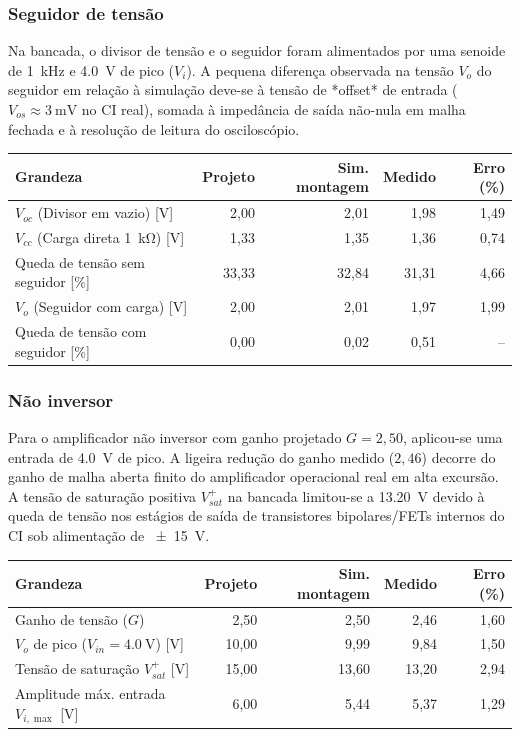 \documentclass[11pt,a4paper]{article}
\begin{document}
\subsubsection{Seguidor de tensão}

Na bancada, o divisor de tensão e o seguidor foram alimentados por uma senoide de \SI{1}{\kilo\hertz} e \SI{4,0}{\volt} de pico ($V_i$). A pequena diferença observada na tensão $V_o$ do seguidor em relação à simulação deve-se à tensão de *offset* de entrada ($V_{os} \approx \SI{3}{\milli\volt}$ no CI real), somada à impedância de saída não-nula em malha fechada e à resolução de leitura do osciloscópio.

\begin{center}
\begin{tabular}{@{}lrrrr@{}}
\toprule
\textbf{Grandeza} & \textbf{Projeto} & \textbf{Sim. montagem} & \textbf{Medido} & \textbf{Erro (\%)} \\
\midrule
$V_{oc}$ (Divisor em vazio) [\si{\volt}] & 2,00 & 2,01 & 1,98 & 1,49 \\
$V_{cc}$ (Carga direta \SI{1}{\kilo\ohm}) [\si{\volt}] & 1,33 & 1,35 & 1,36 & 0,74 \\
Queda de tensão sem seguidor [\%] & 33,33 & 32,84 & 31,31 & 4,66 \\
$V_o$ (Seguidor com carga) [\si{\volt}] & 2,00 & 2,01 & 1,97 & 1,99 \\
Queda de tensão com seguidor [\%] & 0,00 & 0,02 & 0,51 & -- \\
\bottomrule
\end{tabular}
\end{center}

\subsubsection{Não inversor}

Para o amplificador não inversor com ganho projetado $G = 2{,}50$, aplicou-se uma entrada de \SI{4,0}{\volt} de pico. A ligeira redução do ganho medido ($2{,}46$) decorre do ganho de malha aberta finito do amplificador operacional real em alta excursão. A tensão de saturação positiva $V_{sat}^+$ na bancada limitou-se a \SI{13,20}{\volt} devido à queda de tensão nos estágios de saída de transistores bipolares/FETs internos do CI sob alimentação de \SI{\pm 15}{\volt}.

\begin{center}
\begin{tabular}{@{}lrrrr@{}}
\toprule
\textbf{Grandeza} & \textbf{Projeto} & \textbf{Sim. montagem} & \textbf{Medido} & \textbf{Erro (\%)} \\
\midrule
Ganho de tensão ($G$) & 2,50 & 2,50 & 2,46 & 1,60 \\
$V_o$ de pico ($V_{in} = \SI{4,0}{\volt}$) [\si{\volt}] & 10,00 & 9,99 & 9,84 & 1,50 \\
Tensão de saturação $V_{sat}^+$ [\si{\volt}] & 15,00 & 13,60 & 13,20 & 2,94 \\
Amplitude máx. entrada $V_{i,\max}$ [\si{\volt}] & 6,00 & 5,44 & 5,37 & 1,29 \\
\bottomrule
\end{tabular}
\end{center}
\end{document}
